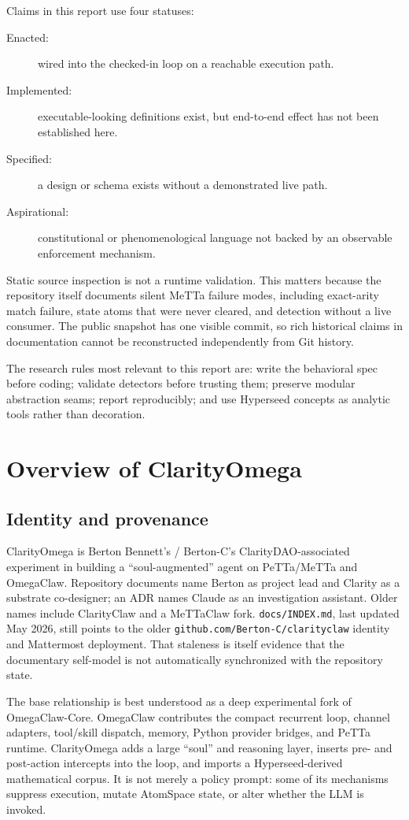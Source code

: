 \documentclass[11pt]{article}
\begin{document}
Claims in this report use four statuses:
\begin{description}
\item[Enacted:] wired into the checked-in loop on a reachable execution path.
\item[Implemented:] executable-looking definitions exist, but end-to-end effect
has not been established here.
\item[Specified:] a design or schema exists without a demonstrated live path.
\item[Aspirational:] constitutional or phenomenological language not backed by
an observable enforcement mechanism.
\end{description}
Static source inspection is not a runtime validation.  This matters because the
repository itself documents silent MeTTa failure modes, including exact-arity
match failure, state atoms that were never cleared, and detection without a live
consumer.  The public snapshot has one visible commit, so rich historical claims
in documentation cannot be reconstructed independently from Git history.

The research rules most relevant to this report are: write the behavioral spec
before coding; validate detectors before trusting them; preserve modular
abstraction seams; report reproducibly; and use Hyperseed concepts as analytic
tools rather than decoration.

\section{Overview of ClarityOmega}

\subsection{Identity and provenance}

ClarityOmega is Berton Bennett's / Berton-C's ClarityDAO-associated experiment in
building a ``soul-augmented'' agent on PeTTa/MeTTa and OmegaClaw.  Repository
documents name Berton as project lead and Clarity as a substrate co-designer; an
ADR names Claude as an investigation assistant.  Older names include
ClarityClaw and a MeTTaClaw fork.  \texttt{docs/INDEX.md}, last updated May 2026,
still points to the older \texttt{github.com/Berton-C/clarityclaw} identity and
Mattermost deployment.  That staleness is itself evidence that the documentary
self-model is not automatically synchronized with the repository state.

The base relationship is best understood as a deep experimental fork of
OmegaClaw-Core.  OmegaClaw contributes the compact recurrent loop, channel
adapters, tool/skill dispatch, memory, Python provider bridges, and PeTTa runtime.
ClarityOmega adds a large ``soul'' and reasoning layer, inserts pre- and
post-action intercepts into the loop, and imports a Hyperseed-derived mathematical
corpus.  It is not merely a policy prompt: some of its mechanisms suppress
execution, mutate AtomSpace state, or alter whether the LLM is invoked.
\end{document}
